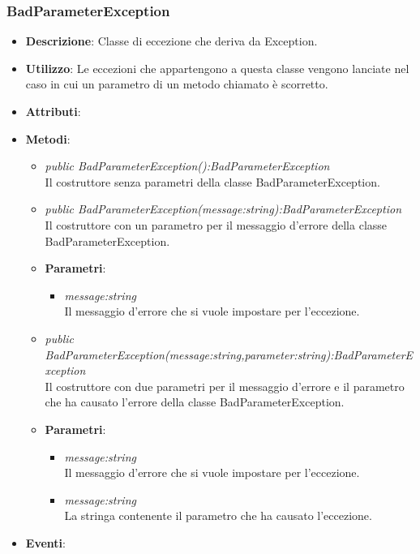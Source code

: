 \subsubsection{BadParameterException}
\begin{itemize}
\item \textbf{Descrizione}: Classe di eccezione che deriva da Exception.
\item \textbf{Utilizzo}: Le eccezioni che appartengono a questa classe vengono lanciate nel caso in cui un parametro di un metodo chiamato è scorretto.
\item \textbf{Attributi}: 
\item \textbf{Metodi}:
	\begin{itemize}
	\item \textit{public BadParameterException():BadParameterException}\\
	Il costruttore senza parametri della classe BadParameterException.
	\item \textit{public BadParameterException(message:string):BadParameterException}\\
	Il costruttore con un parametro per il messaggio d'errore della classe BadParameterException.
			\item{\textbf{Parametri}: \begin{itemize}
			\item \textit{message:string}\\
			Il messaggio d'errore che si vuole impostare per l'eccezione.
			\end{itemize}}
	\item \textit{public BadParameterException(message:string,parameter:string):BadParameterException}\\
	Il costruttore con due parametri per il messaggio d'errore e il parametro che ha causato l'errore della classe BadParameterException.
			\item{\textbf{Parametri}: \begin{itemize}
			\item \textit{message:string}\\
			Il messaggio d'errore che si vuole impostare per l'eccezione.
			\item \textit{message:string}\\
			La stringa contenente il parametro che ha causato l'eccezione.
			\end{itemize}}
	\end{itemize}
\item \textbf{Eventi}:
\end{itemize}